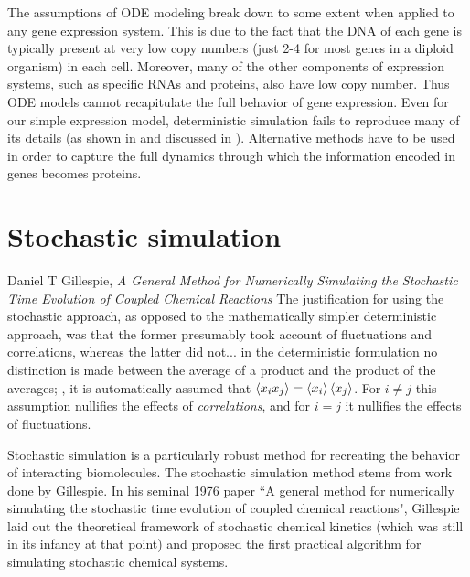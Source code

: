 The assumptions of ODE modeling break down to some extent when applied to any gene expression system. This is due to the fact that the DNA of each gene is typically present at very low copy numbers (just 2-4 for most genes in a diploid organism) in each cell. Moreover, many of the other components of expression systems, such as specific RNAs and proteins, also have low copy number. Thus ODE models cannot recapitulate the full behavior of gene expression. Even for our simple expression model, deterministic simulation fails to reproduce many of its details (as shown in  and discussed in ). Alternative methods have to be used in order to capture the full dynamics through which the information encoded in genes becomes proteins.



\section{Stochastic simulation}\label{sec:stochastic_simulation}

\begin{chapquote}{Daniel T Gillespie, \textit{A General Method for Numerically Simulating the Stochastic Time Evolution
of Coupled Chemical Reactions}\cite{Gillespie:1976bj}}
The justification for using the stochastic approach, as opposed to the mathematically simpler deterministic approach, was that the former presumably took account of fluctuations and correlations, whereas the latter did not... in the deterministic formulation no distinction is made between the average of a product and the product of the averages; \ie, it is automatically assumed that $ \left\langle x_{i} x_{j} \right\rangle = \left\langle x_i \right\rangle \left\langle x_j \right\rangle$. For $i \neq j$ this assumption nullifies the effects of \textit{correlations}, and for $i = j$ it nullifies the effects of \textrm{fluctuations}. 
\end{chapquote}

Stochastic simulation is a particularly robust method for recreating the behavior of interacting biomolecules. The stochastic simulation method stems from work done by Gillespie. In his seminal 1976 paper ``A general method for numerically simulating the stochastic time evolution of coupled chemical reactions"\cite{Gillespie:1976bj}, Gillespie laid out the theoretical framework of stochastic chemical kinetics (which was still in its infancy\cite{McQuarrie:2016cc,Oppenheim:1969hr,Kurtz:2003gz} at that point) and proposed the first practical algorithm for simulating stochastic chemical systems.

